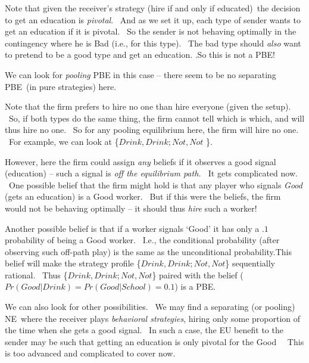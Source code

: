 \documentclass{article}
\begin{document}
Note that given the receiver's strategy (hire if and only if educated)\ the
decision to get an education is \textit{pivotal}. \ And as we set it up,
each type of sender wants to get an education if it is pivotal. \ So the
sender is not behaving optimally in the contingency where he is Bad (i.e.,
for this type). \ The bad type should \textit{also} want to pretend to be a
good type and get an education. .So this is not a PBE!

\bigskip

We can look for \textit{pooling} PBE in this case -- there seem to be no
separating PBE\ (in pure strategies) here.

Note that the firm prefers to hire no one than hire everyone (given the
setup). \ So, if both types do the same thing, the firm cannot tell which is
which, and will thus hire no one. \ So for any pooling equilibrium here, the
firm will hire no one. \ For example, we can look at \{$Drink,Drink;Not,Not$%
\}.

\bigskip 

However, here the firm could assign \textit{any} beliefs if it observes a
good signal (education) -- such a signal is \textit{off the equilibrium
path. \ }It gets complicated now. \ One possible belief that the firm might
hold is that any player who signals \textit{Good} (gets an education) is a
Good worker. \ But if this were the beliefs, the firm would not be behaving
optimally -- it should thus \textit{hire} such a worker!

\bigskip

Another possible belief is that if a worker signals `Good' it has only a $.1$
probability of being a Good worker. \ I.e., the conditional probability
(after observing such off-path play) is the same as the unconditional
probability.This belief will make the strategy profile \{$Drink,Drink;Not,Not
$\} sequentially rational. \ Thus \{$Drink,Drink;Not,Not$\} paired with the
belief ($Pr(Good|Drink)=Pr(Good|School)=0.1$) is a PBE.

\bigskip

We can also look for other possibilities. \ We may find a separating (or
pooling) NE\ where the receiver plays \textit{behavioral strategies}, hiring
only some proportion of the time when she gets a good signal. \ In such a
case, the EU benefit to the sender may be such that getting an education is
only pivotal for the Good \ \ This is too advanced and complicated to cover
now.

\bigskip 

\bigskip 
\end{document}
